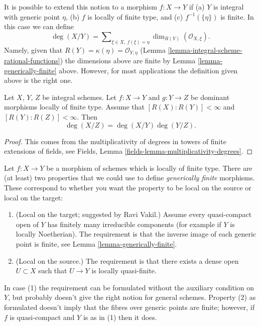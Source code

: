 \noindent
It is possible to extend this notion to a morphism
$f : X \to Y$ if (a) $Y$ is integral with generic point $\eta$,
(b) $f$ is locally of finite type, and (c) $f^{-1}(\{\eta\})$ is finite.
In this case we can define
$$
\deg(X/Y)
=
\sum\nolimits_{\xi \in X, \ f(\xi) = \eta}
\dim_{R(Y)} (\mathcal{O}_{X, \xi}).
$$
Namely, given that $R(Y) = \kappa(\eta) = \mathcal{O}_{Y, \eta}$
(Lemma \ref{lemma-integral-scheme-rational-functions})
the dimensions above are finite by
Lemma \ref{lemma-generically-finite} above.
However, for most applications the definition given above
is the right one.

\begin{lemma}
\label{lemma-degree-composition}
Let $X$, $Y$, $Z$ be integral schemes.
Let $f : X \to Y$ and $g : Y \to Z$ be dominant morphisms locally
of finite type. Assume that $[R(X) : R(Y)] < \infty$ and
$[R(Y) : R(Z)] < \infty$. Then
$$
\deg(X/Z) = \deg(X/Y) \deg(Y/Z).
$$
\end{lemma}

\begin{proof}
This comes from the multiplicativity of degrees in towers
of finite extensions of fields, see
Fields, Lemma \ref{fields-lemma-multiplicativity-degrees}.
\end{proof}

\begin{remark}
\label{remark-definition-generically-finite}
Let $f : X \to Y$ be a morphism of schemes which is locally of finite type.
There are (at least) two properties that we could use to define
{\it generically finite} morphisms. These correspond to whether you
want the property to be local on the source or local on the target:
\begin{enumerate}
\item (Local on the target; suggested by Ravi Vakil.)
Assume every quasi-compact open of $Y$ has finitely
many irreducible components (for example if $Y$ is locally Noetherian).
The requirement is that the inverse image of each generic point is finite, see
Lemma \ref{lemma-generically-finite}.
\item (Local on the source.) The requirement is that there exists
a dense open $U \subset X$ such that $U \to Y$ is locally quasi-finite.
\end{enumerate}
In case (1) the requirement can be formulated without the auxiliary
condition on $Y$, but probably doesn't give the right notion for
general schemes. Property (2) as formulated doesn't imply that the fibres
over generic points are finite; however, if $f$ is
quasi-compact and $Y$ is as in (1) then it does.
\end{remark}

